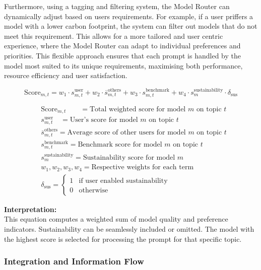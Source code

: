 Furthermore, using a tagging and filtering system, the Model Router can dynamically adjust based on users requirements. For example, if a user priffers a model with a lower carbon footprint, the system can filter out models that do not meet this requirement. This allows for a more tailored and user centric experience, where the Model Router can adapt to individual preferences and priorities. This flexible approach ensures that each prompt is handled by the model most suited to its unique requirements, maximising both performance, resource efficiency and user satisfaction.


\[
\text{Score}_{m,t} = w_1 \cdot s^{\text{user}}_{m,t} + w_2 \cdot \overline{s}^{\text{others}}_{m,t} + w_3 \cdot s^{\text{benchmark}}_{m,t} + w_4 \cdot s^{\text{sustainability}}_{m} \cdot \delta_{\text{sus}}
\]

\begin{align*}
&\text{Score}_{m,t} \quad\quad = \text{Total weighted score for model } m \text{ on topic } t \\
&s^{\text{user}}_{m,t} \quad = \text{User's score for model } m \text{ on topic } t \\
&\overline{s}^{\text{others}}_{m,t} = \text{Average score of other users for model } m \text{ on topic } t \\
&s^{\text{benchmark}}_{m,t} = \text{Benchmark score for model } m \text{ on topic } t \\
&s^{\text{sustainability}}_{m} = \text{Sustainability score for model } m \\
&w_1, w_2, w_3, w_4 = \text{Respective weights for each term} \\
&\delta_{\text{sus}} =
  \begin{cases}
    1 & \text{if user enabled sustainability} \\
    0 & \text{otherwise}
  \end{cases}
\end{align*}



\noindent
    \textbf{Interpretation:} \\
    This equation computes a weighted sum of model quality and preference indicators. Sustainability can be seamlessly included or omitted. The model with the highest score is selected for processing the prompt for that specific topic.
    
\subsubsection{Integration and Information Flow}

